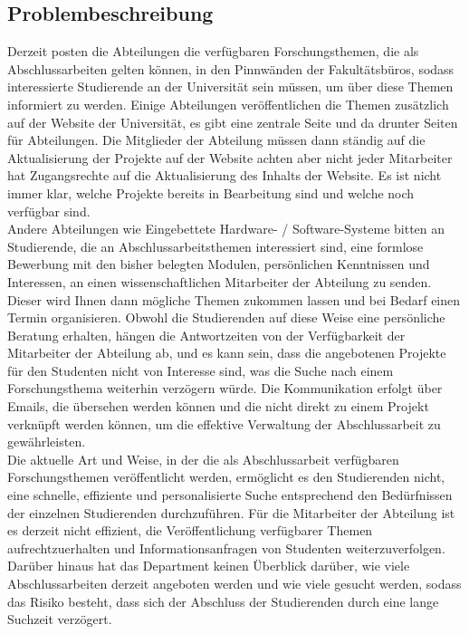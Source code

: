 \subsection{Problembeschreibung}
Derzeit posten die Abteilungen die verfügbaren Forschungsthemen, die als Abschlussarbeiten gelten können, in den Pinnwänden der Fakultätsbüros, sodass interessierte Studierende an der Universität sein müssen, um über diese Themen informiert zu werden.
Einige Abteilungen veröffentlichen die Themen zusätzlich auf der Website der Universität, es gibt eine zentrale Seite und da drunter Seiten für Abteilungen. Die Mitglieder der Abteilung müssen dann ständig auf die Aktualisierung der Projekte auf der Website achten aber nicht jeder Mitarbeiter hat Zugangsrechte auf die Aktualisierung des Inhalts der Website. Es ist nicht immer klar, welche Projekte bereits in Bearbeitung sind und welche noch verfügbar sind.\\

Andere Abteilungen wie Eingebettete Hardware- / Software-Systeme bitten an Studierende, die an Abschlussarbeitsthemen interessiert sind, eine formlose Bewerbung mit   den bisher belegten Modulen, persönlichen Kenntnissen und Interessen, an einen wissenschaftlichen Mitarbeiter der Abteilung zu senden. Dieser wird Ihnen dann mögliche Themen zukommen lassen und bei Bedarf einen Termin organisieren\cite{EHS:2020}.
Obwohl die Studierenden auf diese Weise eine persönliche Beratung erhalten, hängen die Antwortzeiten von der Verfügbarkeit der Mitarbeiter der Abteilung ab, und es kann sein, dass die angebotenen Projekte für den Studenten nicht von Interesse sind, was die Suche nach einem Forschungsthema weiterhin verzögern würde. Die Kommunikation erfolgt über Emails, die übersehen werden können und die nicht direkt zu einem Projekt verknüpft werden können, um die effektive Verwaltung der Abschlussarbeit zu gewährleisten.\\

Die aktuelle Art und Weise, in der die als Abschlussarbeit verfügbaren Forschungsthemen veröffentlicht werden, ermöglicht es den Studierenden nicht, eine schnelle, effiziente und personalisierte Suche entsprechend den Bedürfnissen der einzelnen Studierenden durchzuführen. Für die Mitarbeiter der Abteilung ist es derzeit nicht effizient, die Veröffentlichung verfügbarer Themen aufrechtzuerhalten und Informationsanfragen von Studenten weiterzuverfolgen.\\
Darüber hinaus hat das Department keinen Überblick darüber, wie viele Abschlussarbeiten derzeit angeboten werden und wie viele gesucht werden, sodass das Risiko besteht, dass sich der Abschluss der Studierenden durch eine lange Suchzeit verzögert.